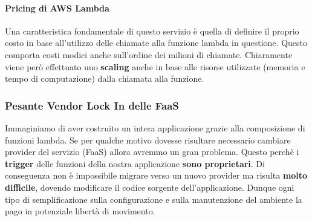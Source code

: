 \documentclass{article}
\begin{document}
\paragraph{Pricing di AWS Lambda} Una caratteristica fondamentale di questo servizio è quella di definire il proprio costo in base all'utilizzo delle chiamate alla funzione lambda in questione. Questo comporta costi modici anche sull'ordine dei milioni di chiamate. Chiaramente viene però effettuato uno \textbf{scaling} anche in base alle risorse utilizzate (memoria e tempo di computazione) dalla chiamata alla funzione.

\subsubsection{Pesante Vendor Lock In delle FaaS}

Immaginiamo di aver costruito un intera applicazione grazie alla composizione di funzioni lambda. Se per qualche motivo dovesse risultare necessario cambiare provider del servizio (FaaS) allora avremmo un gran problema. Questo perchè i \textbf{trigger} delle funzioni della nostra applicazione \textbf{sono proprietari}. Di conseguenza non è impossibile migrare verso un nuovo provider ma risulta \textbf{molto difficile}, dovendo modificare il codice sorgente dell'applicazione. Dunque ogni tipo di semplificazione sulla configurazione e sulla manutenzione del ambiente la pago in potenziale libertà di movimento.

\newpage
\end{document}
